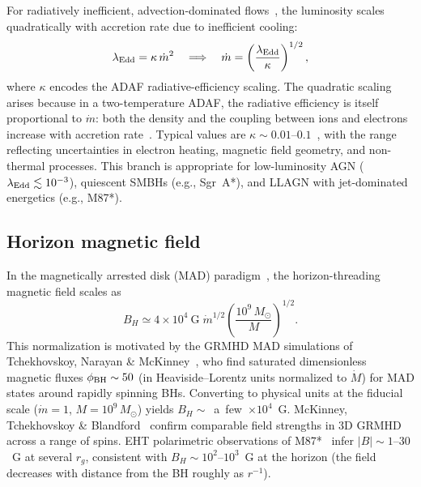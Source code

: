 \documentclass[11pt]{article}
\begin{document}
For radiatively inefficient, advection-dominated flows~\cite{NarayanYi1994,NarayanYi1995,Quataert2001}, the luminosity scales quadratically with accretion rate due to inefficient cooling:
\begin{equation}
\lambda_{\rm Edd} = \kappa\,\dot{m}^2 \quad\Longrightarrow\quad \dot{m} = \left(\frac{\lambda_{\rm Edd}}{\kappa}\right)^{1/2},\label{eq:adaf}
\end{equation}
where $\kappa$ encodes the ADAF radiative-efficiency scaling.
The quadratic scaling arises because in a two-temperature ADAF, the radiative efficiency is itself proportional to $\dot{m}$: both the density and the coupling between ions and electrons increase with accretion rate~\cite{Mahadevan1997,NarayanYi1995}.
Typical values are $\kappa \sim 0.01$--$0.1$~\cite{Mahadevan1997,Quataert2001}, with the range reflecting uncertainties in electron heating, magnetic field geometry, and non-thermal processes.
This branch is appropriate for low-luminosity AGN ($\lambda_{\rm Edd}\lesssim 10^{-3}$), quiescent SMBHs (e.g., Sgr~A*), and LLAGN with jet-dominated energetics (e.g., M87*).

\subsection{Horizon magnetic field}\label{sec:BH}

In the magnetically arrested disk (MAD) paradigm~\cite{Narayan2003,Tchekhovskoy2011,Igumenshchev2003}, the horizon-threading magnetic field scales as
\begin{equation}
B_H \simeq 4\times 10^{4}~\text{G}\;\dot{m}^{1/2}\left(\frac{10^{9}\,M_\odot}{M}\right)^{1/2}.\label{eq:BH}
\end{equation}
This normalization is motivated by the GRMHD MAD simulations of Tchekhovskoy, Narayan \& McKinney~\cite{Tchekhovskoy2011}, who find saturated dimensionless magnetic fluxes $\phi_{\rm BH}\sim 50$ (in Heaviside--Lorentz units normalized to $\dot{M}$) for MAD states around rapidly spinning BHs.
Converting to physical units at the fiducial scale ($\dot{m}=1$, $M=10^9\,M_\odot$) yields $B_H\sim$~a~few~$\times 10^4$~G.
McKinney, Tchekhovskoy \& Blandford~\cite{McKinney2012} confirm comparable field strengths in 3D GRMHD across a range of spins.
EHT polarimetric observations of M87*~\cite{EHT2021M87Pol} infer $|B|\sim 1$--$30$~G at several $r_g$, consistent with $B_H\sim 10^2$--$10^3$~G at the horizon (the field decreases with distance from the BH roughly as $r^{-1}$).
\end{document}
